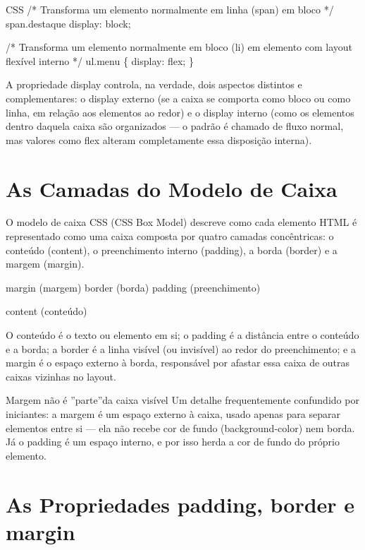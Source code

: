 \begin{codebox}{CSS}
/* Transforma um elemento normalmente em linha (span) em bloco */
span.destaque {
  display: block;
}
\end{codebox}

/* Transforma um elemento normalmente em bloco (li) em elemento com layout flexível interno */ ul.menu \{ display: flex; \}

A propriedade display controla, na verdade, dois aspectos distintos e complementares: o display externo (se a caixa se comporta como bloco ou como linha, em relação aos elementos ao redor) e o display interno (como os elementos dentro daquela caixa são organizados — o padrão é chamado de fluxo normal, mas valores como flex alteram completamente essa disposição interna).

\section{As Camadas do Modelo de Caixa}

O modelo de caixa CSS (CSS Box Model) descreve como cada elemento HTML é representado como uma caixa composta por quatro camadas concêntricas: o conteúdo (content), o preenchimento interno (padding), a borda (border) e a margem (margin).

\begin{infobox}{margin (margem)}
border (borda) padding (preenchimento)
\end{infobox}

content (conteúdo)

O conteúdo é o texto ou elemento em si; o padding é a distância entre o conteúdo e a borda; a border é a linha visível (ou invisível) ao redor do preenchimento; e a margin é o espaço externo à borda, responsável por afastar essa caixa de outras caixas vizinhas no layout.

\begin{infobox}{Margem não é ”parte”da caixa visível}
Um detalhe frequentemente confundido por iniciantes: a margem é um espaço externo à caixa, usado apenas para separar elementos entre si — ela não recebe cor de fundo (background-color) nem borda. Já o padding é um espaço interno, e por isso herda a cor de fundo do próprio elemento.
\end{infobox}

\section{As Propriedades padding, border e margin}

